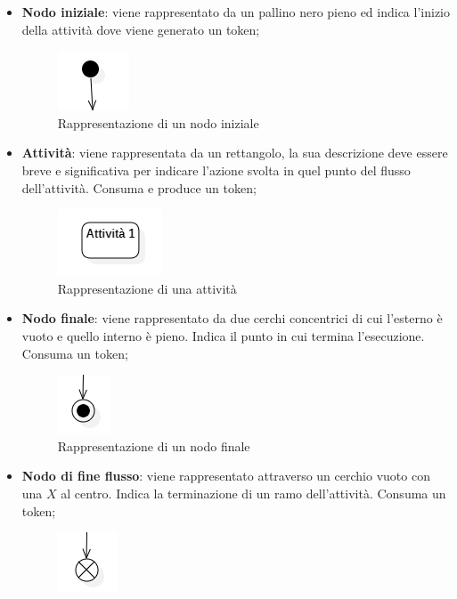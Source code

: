 \begin{itemize}
	\item \textbf{Nodo iniziale}: viene rappresentato da un pallino nero pieno ed indica l'inizio della attività dove viene generato un token;
	\begin{figure}[H]
		\centering\includegraphics{../immagini/normeUML/nodoIni.png}
		\caption{Rappresentazione di un nodo iniziale}
	\end{figure}
	\item \textbf{Attività}: viene rappresentata da un rettangolo, la sua descrizione deve essere breve e significativa per indicare l'azione svolta in quel punto del flusso dell'attività. Consuma e produce un token;
	\begin{figure}[H]
		\centering\includegraphics{../immagini/normeUML/attivita.png}
		\caption{Rappresentazione di una attività}
	\end{figure}
	\item \textbf{Nodo finale}: viene rappresentato da due cerchi concentrici di cui l'esterno è vuoto e quello interno è pieno. Indica il punto in cui termina l'esecuzione. Consuma un token;
	\begin{figure}[H]
		\centering\includegraphics{../immagini/normeUML/nodoFine.png}
		\caption{Rappresentazione di un nodo finale}
	\end{figure}
	\item \textbf{Nodo di fine flusso}: viene rappresentato attraverso un cerchio vuoto con una $X$ al centro. Indica la terminazione di un ramo dell'attività. Consuma un token;
	\begin{figure}[H]
		\centering\includegraphics{../immagini/normeUML/nodoFineFlusso.png}

\end{figure}
\end{itemize}
